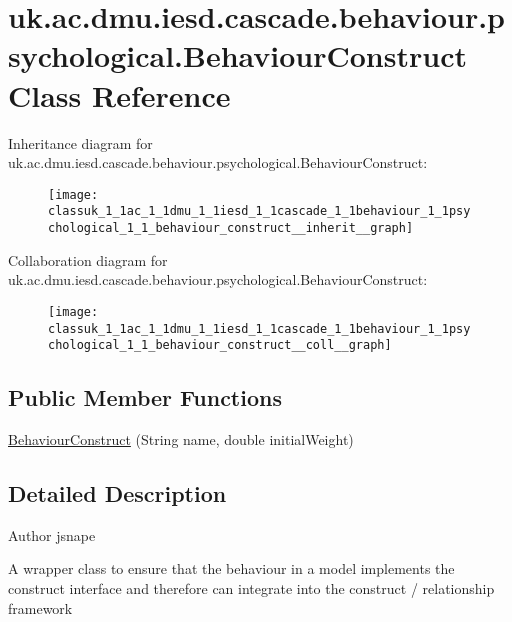 \hypertarget{classuk_1_1ac_1_1dmu_1_1iesd_1_1cascade_1_1behaviour_1_1psychological_1_1_behaviour_construct}{\section{uk.\-ac.\-dmu.\-iesd.\-cascade.\-behaviour.\-psychological.\-Behaviour\-Construct Class Reference}
\label{classuk_1_1ac_1_1dmu_1_1iesd_1_1cascade_1_1behaviour_1_1psychological_1_1_behaviour_construct}
}


Inheritance diagram for uk.\-ac.\-dmu.\-iesd.\-cascade.\-behaviour.\-psychological.\-Behaviour\-Construct\-:\nopagebreak
\begin{figure}[H]
\begin{center}
\leavevmode
\texttt{[image: classuk\_1\_1ac\_1\_1dmu\_1\_1iesd\_1\_1cascade\_1\_1behaviour\_1\_1psychological\_1\_1\_behaviour\_construct\_\_inherit\_\_graph]}
\end{center}
\end{figure}


Collaboration diagram for uk.\-ac.\-dmu.\-iesd.\-cascade.\-behaviour.\-psychological.\-Behaviour\-Construct\-:\nopagebreak
\begin{figure}[H]
\begin{center}
\leavevmode
\texttt{[image: classuk\_1\_1ac\_1\_1dmu\_1\_1iesd\_1\_1cascade\_1\_1behaviour\_1\_1psychological\_1\_1\_behaviour\_construct\_\_coll\_\_graph]}
\end{center}
\end{figure}
\subsection*{Public Member Functions}
\begin{DoxyCompactItemize}
\item 
\hyperlink{classuk_1_1ac_1_1dmu_1_1iesd_1_1cascade_1_1behaviour_1_1psychological_1_1_behaviour_construct_a2677d080266acc06c55afd59e2878771}{Behaviour\-Construct} (String name, double initial\-Weight)
\end{DoxyCompactItemize}


\subsection{Detailed Description}
\begin{DoxyAuthor}{Author}
jsnape
\end{DoxyAuthor}
A wrapper class to ensure that the behaviour in a model implements the construct interface and therefore can integrate into the construct / relationship framework 

